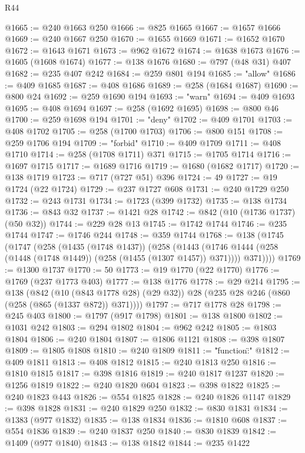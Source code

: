 \begin{lexlean}{R44}
\begin{coremodule}
@1665 := @240 @1663 @250
@1666 := @825 @1665
@1667 := @1657 @1666
@1669 := @240 @1667 @250
@1670 := @1655 @1669
@1671 := @1652 @1670
@1672 := @1643 @1671
@1673 := @962 @1672
@1674 := @1638 @1673
@1676 := @1605 (@1608 @1674)
@1677 := @138 @1676
@1680 := @797 (@48 @31) @407
@1682 := @235 @407 @242
@1684 := @259 @801 @194
@1685 := "allow"
@1686 := @409 @1685
@1687 := @408 @1686
@1689 := @258 (@1684 @1687)
@1690 := @800 @24
@1692 := @259 @1690 @194
@1693 := "warn"
@1694 := @409 @1693
@1695 := @408 @1694
@1697 := @258 (@1692 @1695)
@1698 := @800 @46
@1700 := @259 @1698 @194
@1701 := "deny"
@1702 := @409 @1701
@1703 := @408 @1702
@1705 := @258 (@1700 @1703)
@1706 := @800 @151
@1708 := @259 @1706 @194
@1709 := "forbid"
@1710 := @409 @1709
@1711 := @408 @1710
@1714 := @258 (@1708 @1711) @371
@1715 := @1705 @1714
@1716 := @1697 @1715
@1717 := @1689 @1716
@1719 := @1680 (@1682 @1717)
@1720 := @138 @1719
@1723 := @717 (@727 @51) @396
@1724 := 49
@1727 := @19 @1724 (@22 @1724)
@1729 := @237 @1727 @608
@1731 := @240 @1729 @250
@1732 := @243 @1731
@1734 := @1723 (@399 @1732)
@1735 := @138 @1734
@1736 := @843 @32
@1737 := @1421 @28
@1742 := @842 (@10 (@1736 @1737) (@50 @32))
@1744 := @229 @28 @13
@1745 := @1742 @1744
@1746 := @235 @1744
@1747 := @1746 @244
@1748 := @359 @1744
@1768 := @138
    (@1745
      (@1747
        (@258
          (@1435 (@1748 @1437))
          (@258
            (@1443 (@1746 @1444 (@258 (@1448 (@1748 @1449)) (@258 (@1455 (@1307 @1457)) @371))))
            @371))))
@1769 := @1300 @1737
@1770 := 50
@1773 := @19 @1770 (@22 @1770)
@1776 := @1769 (@237 @1773 @403)
@1777 := @138 @1776
@1778 := @29 @214
@1795 := @138
    (@842
      (@10 (@843 @1778 @28) (@29 @32))
      @28
      (@235 @28 @246 (@860 (@258 (@865 (@1337 @872)) @371))))
@1797 := @717 @1778 @28
@1798 := @245 @403
@1800 := @1797 (@917 @1798)
@1801 := @138 @1800
@1802 := @1031 @242
@1803 := @294 @1802
@1804 := @962 @242
@1805 := @1803 @1804
@1806 := @240 @1804
@1807 := @1806 @1121
@1808 := @398 @1807
@1809 := @1805 @1808
@1810 := @240 @1809
@1811 := "{\"function\":"
@1812 := @409 @1811
@1813 := @408 @1812
@1815 := @240 @1813 @250
@1816 := @1810 @1815
@1817 := @398 @1816
@1819 := @240 @1817 @1237
@1820 := @1256 @1819
@1822 := @240 @1820 @604
@1823 := @398 @1822
@1825 := @240 @1823 @443
@1826 := @554 @1825
@1828 := @240 @1826 @1147
@1829 := @398 @1828
@1831 := @240 @1829 @250
@1832 := @830 @1831
@1834 := @1383 (@977 @1832)
@1835 := @138 @1834
@1836 := @1810 @608
@1837 := @554 @1836
@1839 := @240 @1837 @250
@1840 := @830 @1839
@1842 := @1409 (@977 @1840)
@1843 := @138 @1842
@1844 := @235 @1422
}
\end{coremodule}
\end{lexlean}
